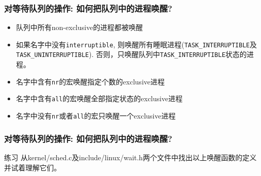 \documentclass[xcolor=svgnames]{beamer}
\begin{document}
\begin{CJK*}{UTF8}{gbsn}
\begin{frame}[fragile]
\frametitle{对等待队列的操作: 如何把队列中的进程唤醒?}
\begin{itemize}
\item 队列中所有non-exclusive的进程都被唤醒
\item 如果名字中没有\verb|interruptible|, 则唤醒所有睡眠进程(\verb|TASK_INTERRUPTIBLE|及\verb|TASK_UNINTERRUPTIBLE|).
否则，只唤醒队列中\verb|TASK_INTERRUPTIBLE|状态的进程。
\item 名字中含有\verb|nr|的宏唤醒指定个数的exclusive进程
\item 名字中含有\verb|all|的宏唤醒全部指定状态的exclusive进程
\item 名字中没有\verb|nr|或者\verb|all|的宏只唤醒一个exclusive进程
\end{itemize}
\end{frame}


\begin{frame}[fragile]
\frametitle{对等待队列的操作: 如何把队列中的进程唤醒?}
\begin{block}{练习}
从kernel/sched.c及include/linux/wait.h两个文件中找出以上唤醒函数的定义并试着理解它们。
\end{block}
\end{frame}



\end{CJK*}
\end{document}
